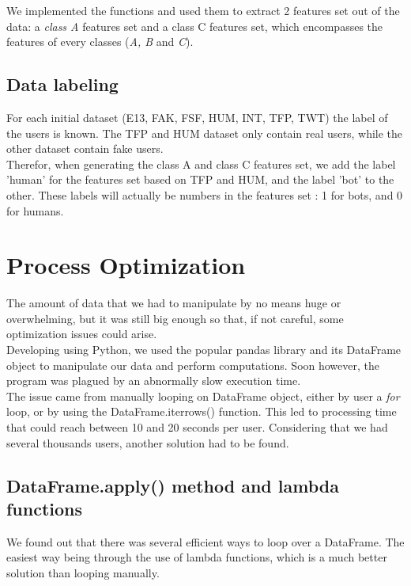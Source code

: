 \documentclass[a4paper,11pt]{article}
\begin{document}
We implemented the functions and used them to extract 2 features set out of the data: a \textit{class A} features set and a class C features set, which encompasses the features of every classes (\textit{A, B} and \textit{C}).

\subsection{Data labeling}
For each initial dataset (E13, FAK, FSF, HUM, INT, TFP, TWT) the label of the users is known. The TFP and HUM dataset only contain real users, while the other dataset contain fake users.\\

Therefor, when generating the class A and class C features set, we add the label 'human' for the features set based on TFP and HUM, and the label 'bot' to the other. These labels will actually be numbers in the features set : 1 for bots, and 0 for humans.

\section{Process Optimization}
The amount of data that we had to manipulate by no means huge or overwhelming, but it was still big enough so that, if not careful, some optimization issues could arise.\\

Developing using Python, we used the popular pandas library and its DataFrame object to manipulate our data and perform computations. Soon however, the program was plagued by an abnormally slow execution time.\\

The issue came from manually looping on DataFrame object, either by user a \textit{for} loop, or by using the DataFrame.iterrows() function. This led to processing time that could reach between 10 and 20 seconds per user. Considering that we had several thousands users, another solution had to be found.

\subsection{DataFrame.apply() method and lambda functions}
We found out that there was several efficient ways to loop over a DataFrame. The easiest way being through the use of lambda functions, which is a much better solution than looping manually.\\
\end{document}
